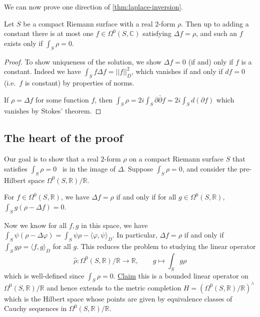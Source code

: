 We can now prove one direction of \cref{thm:laplace-inversion}.

\begin{corollary}
    Let \(S\) be a compact Riemann surface with a real \(2\)-form \(\rho\).
    Then up to adding a constant there is at most one \(f\in
    \Omega^0(S,\mathbb{C})\) satisfying \(\Delta f = \rho\), and such an \(f\)
    exists only if \(\int_S \rho = 0\).

    \begin{proof}
        To show uniqueness of the solution, we show \(\Delta f = 0\) (if and)
        only if \(f\) is a constant. Indeed we have \(\int_S f\Delta
        f = ||f||_D^2\), which vanishes if and only if \(df=0\) (i.e.\ \(f\) is
        constant) by properties of norms.

        If \(\rho = \Delta f\) for some function \(f\), then \(\int_S\rho =
        2i \int_S \partial \bar\partial f = 2i \int_S d(\partial f)\) which
        vanishes by Stokes' theorem.
    \end{proof}
\end{corollary}

\subsection{The heart of the proof} Our goal is to show that
a real \(2\)-form \(\rho\) on a compact Riemann surface \(S\) that satisfies
\(\int_S\rho = 0\) \ is in the image of \(\Delta\). Suppose \(\int_S\rho=0\),
and consider the pre-Hilbert space \(\Omega^0(S,\mathbb{R})/\mathbb{R}\).

\begin{exercise}
    For \(f\in \Omega^0(S,\mathbb{R})\), we have \(\Delta f = \rho \) if and
    only if for all \(g\in \Omega^0(S,\mathbb{R})\), \(\int_S g(\rho - \Delta
    f) = 0\).
\end{exercise}

Now we know for all \(f,g\) in this space, we have
\(\int_S\psi(\rho-\Delta\varphi) = \int_S\psi\rho - \langle
\varphi,\psi\rangle_D\). In particular, \(\Delta f = \rho\) if
and only if \(\int_S g\rho = \langle f,g\rangle_D\) for all \(g\). This reduces
the problem to studying the linear operator
\[
    \hat\rho :\Omega^0(S,\mathbb{R})/\mathbb{R} \to \mathbb{R}, \qquad g\mapsto
    \int_S g\rho
\]
which is well-defined since \(\int_S \rho = 0\). \underline{Claim} this is a
bounded linear operator on \(\Omega^0(S,\mathbb{R})/\mathbb{R}\) and hence
extends to the metric completion \(H =
(\Omega^0(S,\mathbb{R})/\mathbb{R})^{\wedge}\) which is the Hilbert space whose
points are given by equivalence classes of Cauchy sequences in
\(\Omega^0(S,\mathbb{R})/\mathbb{R}\).

